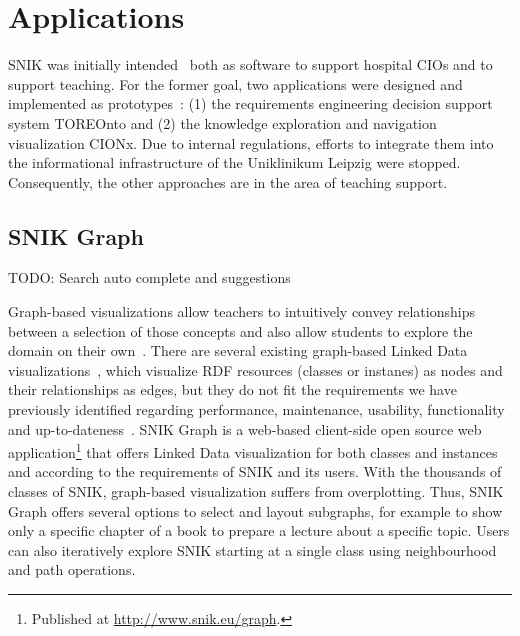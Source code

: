 \documentclass[conference]{IEEEtran}
\newcommand{\citep}{\cite}%
\begin{document}
\section{Applications}
SNIK was initially intended~\citep{domaene} both as  software to support hospital CIOs and to support teaching.
For the former goal, two applications were designed and implemented as prototypes~\citep{toreonto}: (1) the requirements engineering decision support system TOREOnto and (2) the knowledge exploration and navigation visualization CIONx.
Due to internal regulations, efforts to integrate them into the informational infrastructure of the Uniklinikum Leipzig were stopped.
Consequently, the other approaches are in the area of teaching support.


\subsection{SNIK Graph}\label{sec:snik-graph}
TODO: Search auto complete and suggestions

Graph-based visualizations allow teachers to intuitively convey relationships between a selection of those concepts and also allow students to explore the domain on their own~\cite{ontologybased}.
There are several existing graph-based Linked Data visualizations~\cite{linkeddatavisualization}, which visualize RDF resources (classes or instanes) as nodes and their relationships as edges, but they do not fit the requirements we have previously identified regarding performance, maintenance, usability, functionality and up-to-dateness~\cite{visualizationoflargeontologies}.
SNIK Graph is a web-based client-side open source web application\footnote{Published at \url{http://www.snik.eu/graph}.} that offers Linked Data visualization for both classes and instances and according to the requirements of SNIK and its users.
With the thousands of classes of SNIK, graph-based visualization suffers from overplotting.
Thus, SNIK Graph offers several options to select and layout subgraphs, for example to show only a specific chapter of a book to prepare a lecture about a specific topic.
Users can also iteratively explore SNIK starting at a single class using neighbourhood and path operations. %
\end{document}
